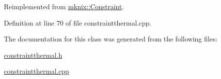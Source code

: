 Reimplemented from \hyperlink{classmknix_1_1_constraint_ac376643d6d73cb3b591ba80aae9f7166}{mknix\+::\+Constraint}.



Definition at line 70 of file constraintthermal.\+cpp.



The documentation for this class was generated from the following files\+:\begin{DoxyCompactItemize}
\item 
\hyperlink{constraintthermal_8h}{constraintthermal.\+h}\item 
\hyperlink{constraintthermal_8cpp}{constraintthermal.\+cpp}\end{DoxyCompactItemize}
